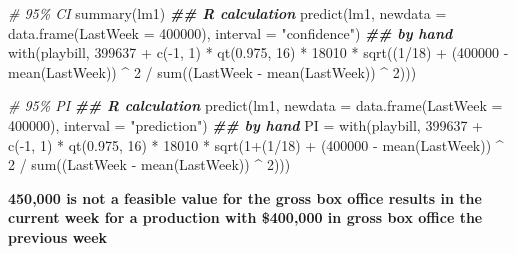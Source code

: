 \documentclass[
]{article}
\newenvironment{Shaded}{\begin{snugshade}}{\end{snugshade}}
\newcommand{\AttributeTok}[1]{\textcolor[rgb]{0.77,0.63,0.00}{#1}}
\newcommand{\CommentTok}[1]{\textcolor[rgb]{0.56,0.35,0.01}{\textit{#1}}}
\newcommand{\DecValTok}[1]{\textcolor[rgb]{0.00,0.00,0.81}{#1}}
\newcommand{\DocumentationTok}[1]{\textcolor[rgb]{0.56,0.35,0.01}{\textbf{\textit{#1}}}}
\newcommand{\FloatTok}[1]{\textcolor[rgb]{0.00,0.00,0.81}{#1}}
\newcommand{\FunctionTok}[1]{\textcolor[rgb]{0.00,0.00,0.00}{#1}}
\newcommand{\NormalTok}[1]{#1}
\newcommand{\OtherTok}[1]{\textcolor[rgb]{0.56,0.35,0.01}{#1}}
\newcommand{\SpecialCharTok}[1]{\textcolor[rgb]{0.00,0.00,0.00}{#1}}
\newcommand{\StringTok}[1]{\textcolor[rgb]{0.31,0.60,0.02}{#1}}
\begin{document}
\begin{Shaded}
\begin{Highlighting}[]
\CommentTok{\# 95\% CI}
\FunctionTok{summary}\NormalTok{(lm1)}
\DocumentationTok{\#\# R calculation}
\FunctionTok{predict}\NormalTok{(lm1, }\AttributeTok{newdata =} \FunctionTok{data.frame}\NormalTok{(}\AttributeTok{LastWeek =} \DecValTok{400000}\NormalTok{), }\AttributeTok{interval =} \StringTok{"confidence"}\NormalTok{)}
\DocumentationTok{\#\# by hand}
\FunctionTok{with}\NormalTok{(playbill, }\DecValTok{399637} \SpecialCharTok{+} \FunctionTok{c}\NormalTok{(}\SpecialCharTok{{-}}\DecValTok{1}\NormalTok{, }\DecValTok{1}\NormalTok{) }\SpecialCharTok{*} \FunctionTok{qt}\NormalTok{(}\FloatTok{0.975}\NormalTok{, }\DecValTok{16}\NormalTok{) }\SpecialCharTok{*} \DecValTok{18010} \SpecialCharTok{*} 
  \FunctionTok{sqrt}\NormalTok{((}\DecValTok{1}\SpecialCharTok{/}\DecValTok{18}\NormalTok{) }\SpecialCharTok{+}\NormalTok{ (}\DecValTok{400000} \SpecialCharTok{{-}} \FunctionTok{mean}\NormalTok{(LastWeek)) }\SpecialCharTok{\^{}} \DecValTok{2} \SpecialCharTok{/} \FunctionTok{sum}\NormalTok{((LastWeek }\SpecialCharTok{{-}} \FunctionTok{mean}\NormalTok{(LastWeek)) }\SpecialCharTok{\^{}} \DecValTok{2}\NormalTok{)))}


\CommentTok{\# 95\% PI}
\DocumentationTok{\#\# R calculation}
\FunctionTok{predict}\NormalTok{(lm1, }\AttributeTok{newdata =} \FunctionTok{data.frame}\NormalTok{(}\AttributeTok{LastWeek =} \DecValTok{400000}\NormalTok{), }\AttributeTok{interval =} \StringTok{"prediction"}\NormalTok{)}
\DocumentationTok{\#\# by hand}
\NormalTok{PI }\OtherTok{=} \FunctionTok{with}\NormalTok{(playbill, }\DecValTok{399637} \SpecialCharTok{+} \FunctionTok{c}\NormalTok{(}\SpecialCharTok{{-}}\DecValTok{1}\NormalTok{, }\DecValTok{1}\NormalTok{) }\SpecialCharTok{*} \FunctionTok{qt}\NormalTok{(}\FloatTok{0.975}\NormalTok{, }\DecValTok{16}\NormalTok{) }\SpecialCharTok{*} \DecValTok{18010} \SpecialCharTok{*} 
  \FunctionTok{sqrt}\NormalTok{(}\DecValTok{1}\SpecialCharTok{+}\NormalTok{(}\DecValTok{1}\SpecialCharTok{/}\DecValTok{18}\NormalTok{) }\SpecialCharTok{+}\NormalTok{ (}\DecValTok{400000} \SpecialCharTok{{-}} \FunctionTok{mean}\NormalTok{(LastWeek)) }\SpecialCharTok{\^{}} \DecValTok{2} \SpecialCharTok{/} \FunctionTok{sum}\NormalTok{((LastWeek }\SpecialCharTok{{-}} \FunctionTok{mean}\NormalTok{(LastWeek)) }\SpecialCharTok{\^{}} \DecValTok{2}\NormalTok{)))}
\end{Highlighting}
\end{Shaded}

\textbf{450,000 is not a feasible value for the gross box office results
in the current week for a production with \$400,000 in gross box office
the previous week}
\end{document}

